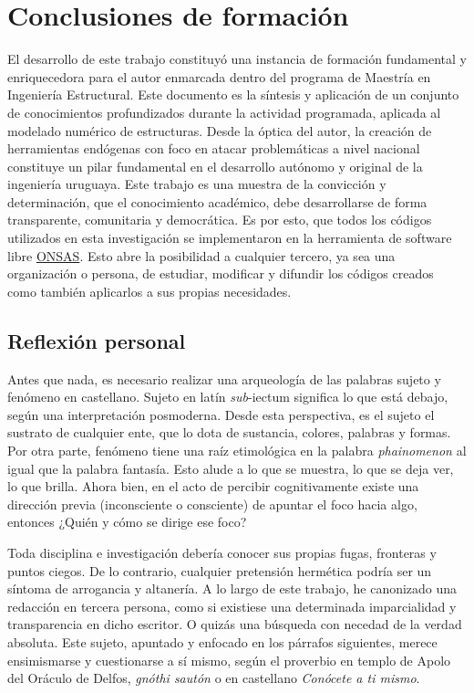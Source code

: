 \section{Conclusiones de formación}
El desarrollo de este trabajo constituyó una instancia de formación fundamental y enriquecedora para el autor enmarcada dentro del programa de Maestría en Ingeniería Estructural. Este documento es la síntesis y aplicación de un conjunto de conocimientos profundizados durante la actividad programada, aplicada al modelado numérico de estructuras. Desde la óptica del autor, la creación de herramientas endógenas con foco en atacar problemáticas a nivel nacional constituye un pilar fundamental en el desarrollo autónomo y original de la ingeniería uruguaya. Este trabajo es una muestra de la convicción y determinación, que el conocimiento académico, debe desarrollarse de forma transparente, comunitaria y democrática. Es por esto, que todos los códigos utilizados en esta investigación se implementaron en la herramienta de software libre \href{https://github.com/ONSAS/ONSAS.m/}{ONSAS}. Esto abre la posibilidad a cualquier tercero, ya sea una organización o persona, de estudiar, modificar y difundir los códigos creados como también aplicarlos a sus propias necesidades. 
\subsection{Reflexión personal}
Antes que nada, es necesario realizar una arqueología de las palabras sujeto y fenómeno en castellano. Sujeto en latín \emph{sub}-{iectum} significa lo que está debajo, según una interpretación posmoderna. Desde esta perspectiva, es el sujeto el sustrato de cualquier ente, que lo dota de sustancia, colores, palabras y formas. Por otra parte, fenómeno tiene una raíz etimológica en la palabra \emph{phainomenon} al igual que la palabra fantasía. Esto alude a lo que se muestra, lo que se deja ver, lo que brilla. Ahora bien, en el acto de percibir cognitivamente existe una dirección previa (inconsciente o consciente) de apuntar el foco hacia algo, entonces ¿Quién y cómo se dirige ese foco?

Toda disciplina e investigación debería conocer sus propias fugas, fronteras y puntos ciegos. De lo contrario, cualquier pretensión hermética podría ser un síntoma de arrogancia y altanería.  A lo largo de este trabajo, he canonizado una redacción en tercera persona, como si existiese una determinada imparcialidad y transparencia en dicho escritor. O quizás una búsqueda con necedad de la verdad absoluta. Este sujeto, apuntado y enfocado en los párrafos siguientes, merece ensimismarse y cuestionarse a sí mismo, según el proverbio en templo de Apolo del Oráculo de Delfos, \emph{gnóthi sautón} o en castellano \emph{Conócete a ti mismo}.

